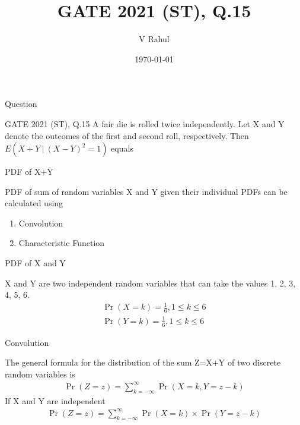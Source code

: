 \documentclass{beamer}
\title{GATE 2021 (ST), Q.15}
\author{V Rahul}
\institute{IITH}
\date{\today}
\providecommand{\brak}[1]{\ensuremath{\left(#1\right)}}
\begin{document}
\begin{frame}
  \titlepage
\end{frame}
\begin{frame}{Question}
    \begin{block}{GATE 2021 (ST), Q.15}
        A fair die is rolled twice independently. Let X and Y denote the outcomes of the first and second roll, respectively. Then $E(X+Y\:|\:(X-Y)^2=1)$ equals
    \end{block}
\end{frame}
\begin{frame}{PDF of X+Y}
\begin{block}{}
    PDF of sum of random variables X and Y given their individual PDFs can be calculated using
    \begin{enumerate}
        \item Convolution
        \item Characteristic Function
    \end{enumerate}
    \end{block}
\end{frame}
\begin{frame}{PDF of X and Y}
    \begin{block}{}
    X and Y are two independent random variables that can take the values 1, 2, 3, 4, 5, 6.
    \begin{align}
        \Pr\brak{X=k}=\frac{1}{6}, 1\leq k \leq 6\\
        \Pr\brak{Y=k}=\frac{1}{6}, 1\leq k \leq 6
    \end{align}
    \end{block}
\end{frame}
\begin{frame}{Convolution}
    \begin{block}{}
        The general formula for the distribution of the sum Z=X+Y of two discrete random variables is\\
        \begin{align}
            \Pr\brak{Z=z} = \sum_{k=-\infty}^{\infty} \Pr\brak{X=k,Y=z-k}
        \end{align}
        If X and Y are independent\\
        \begin{align}
            \Pr\brak{Z=z} = \sum_{k=-\infty}^{\infty} \Pr\brak{X=k}\times\Pr\brak{Y=z-k}
        \end{align}
    \end{block}
\end{frame}
\end{document}
